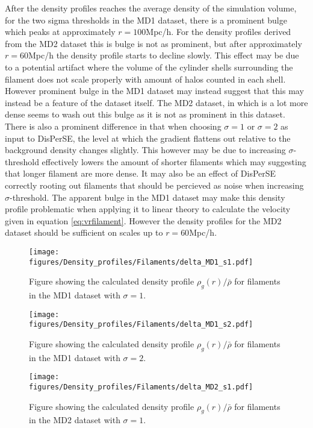 After the density profiles reaches the average density of the simulation volume, for the two sigma thresholds in the MD1 dataset, there is a prominent bulge which peaks at approximately $r=100$Mpc/h. For the density profiles derived from the MD2 dataset this is bulge is not as prominent, but after approximately $r=60$Mpc/h the density profile starts to decline slowly. This effect may be due to a potential artifact where the volume of the cylinder shells surrounding the filament does not scale properly with amount of halos counted in each shell. However prominent bulge in the MD1 dataset may instead suggest that this may instead be a feature of the dataset itself. The MD2 dataset, in which is a lot more dense seems to wash out this bulge as it is not as prominent in this dataset. There is also a prominent difference in that when choosing $\sigma=1$ or $\sigma=2$ as input to DisPerSE, the level at which the gradient flattens out relative to the background density changes slightly. This however may be due to increasing $\sigma$-threshold effectively lowers the amount of shorter filaments which may suggesting that longer filament are more dense. It may also be an effect of DisPerSE correctly rooting out filaments that should be percieved as noise when increasing $\sigma$-threshold. The apparent bulge in the MD1 dataset may make this density profile problematic when applying it to linear theory to calculate the velocity given in equation \ref{eq:vrfilament}. However the density profiles for the MD2 dataset should be sufficient on scales up to $r=60$Mpc/h.
\begin{figure}[htbp]
    \texttt{[image: figures/Density\_profiles/Filaments/delta\_MD1\_s1.pdf]}
    \caption{Figure showing the calculated density profile $\rho_g(r)/\bar{\rho}$ for filaments in the MD1 dataset with $\sigma=1$.}
    \label{fig:fildensitytMD1s1}
\end{figure}

\begin{figure}[htbp]
    \texttt{[image: figures/Density\_profiles/Filaments/delta\_MD1\_s2.pdf]}
    \caption{Figure showing the calculated density profile $\rho_g(r)/\bar{\rho}$ for filaments in the MD1 dataset with $\sigma=2$.}
    \label{fig:fildensitytMD1s2}
\end{figure}

\begin{figure}[htbp]
    \texttt{[image: figures/Density\_profiles/Filaments/delta\_MD2\_s1.pdf]}
    \caption{Figure showing the calculated density profile $\rho_g(r)/\bar{\rho}$ for filaments in the MD2 dataset with $\sigma=1$.}
    \label{fig:fildensitytMD2s1}
\end{figure}

